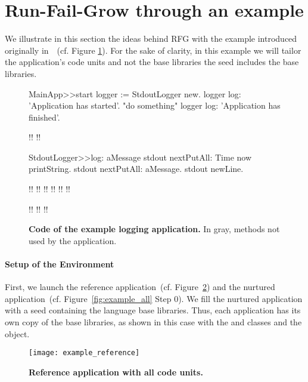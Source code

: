 \section{Run-Fail-Grow through an example}\label{sec:rfg_example}
We illustrate in this section the ideas behind RFG with the example introduced originally in~~(cf. Figure \ref{fig:code_example_again}). For the sake of clarity, in this example we will tailor the application's code units and not the base libraries \ie the seed includes the base libraries.

\begin{figure}[ht]
\begin{code}
MainApp>>start
    logger := StdoutLogger new.
    logger log: 'Application has started'.
    "do something"
    logger log: 'Application has finished'.

!!
!!

StdoutLogger>>log: aMessage
    stdout nextPutAll: Time now printString.
    stdout nextPutAll: aMessage.
    stdout newLine.
    
!!
!!
!!
!!
!!
!!

!!
!!
!!
\end{code}

\caption{ \small\textbf{Code of the example logging application.} In gray, methods not used by the application.\label{fig:code_example_again}}
\end{figure}


\paragraph{Setup of the Environment} First, we launch the reference application~(cf. Figure~\ref{fig:example_reference}) and the nurtured application~(cf. Figure~\ref{fig:example_all} Step 0). We fill the nurtured application with a seed containing the language base libraries. Thus, each application has its own copy of the base libraries, as shown in this case with the  and  classes and the  object.

\begin{figure}[ht]
\begin{center}
\texttt{[image: example\_reference]}
\caption{\small\textbf{Reference application with all code units.}\label{fig:example_reference}}
\end{center}
\end{figure}


